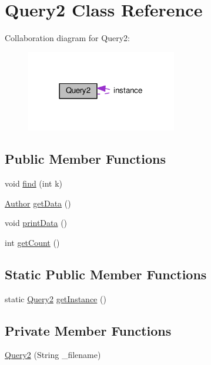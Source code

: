 \hypertarget{classQuery2}{}\section{Query2 Class Reference}
\label{classQuery2}


Collaboration diagram for Query2\+:\nopagebreak
\begin{figure}[H]
\begin{center}
\leavevmode
\includegraphics[width=186pt]{classQuery2__coll__graph}
\end{center}
\end{figure}
\subsection*{Public Member Functions}
\begin{DoxyCompactItemize}
\item 
void \hyperlink{classQuery2_ab5f9fd59b15dcdef599faec26ae49424}{find} (int k)
\item 
\hyperlink{classAuthor}{Author} \hyperlink{classQuery2_a70190cc13fb74f6bf00ce1347a8b8946}{get\+Data} ()
\item 
void \hyperlink{classQuery2_ae1f51e2c333e090fcd07a573a2ba7b10}{print\+Data} ()
\item 
int \hyperlink{classQuery2_afc9171c552d575feafb5e5f4b3a6cc19}{get\+Count} ()
\end{DoxyCompactItemize}
\subsection*{Static Public Member Functions}
\begin{DoxyCompactItemize}
\item 
static \hyperlink{classQuery2}{Query2} \hyperlink{classQuery2_a0a1270d32e0b8ac467ad09f546e0c3ee}{get\+Instance} ()
\end{DoxyCompactItemize}
\subsection*{Private Member Functions}
\begin{DoxyCompactItemize}
\item 
\hyperlink{classQuery2_ad2ab065a532d46e6a40c16fff5041a52}{Query2} (String \+\_\+filename)
\end{DoxyCompactItemize}
